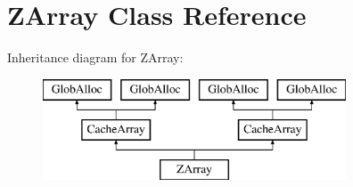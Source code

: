 \hypertarget{classZArray}{\section{Z\-Array Class Reference}
\label{classZArray}
}
Inheritance diagram for Z\-Array\-:\begin{figure}[H]
\begin{center}
\leavevmode
\includegraphics[height=3.000000cm]{classZArray}
\end{center}
\end{figure}
